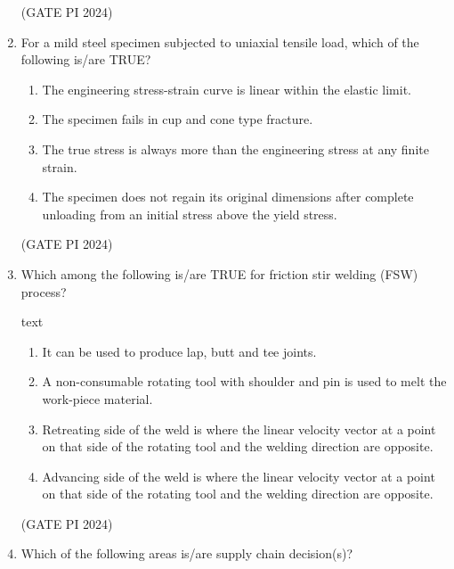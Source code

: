 \documentclass[journal,12pt,onecolumn]{IEEEtran}
\theoremstyle{remark}
\begin{document}
\begin{enumerate}
\hfill (GATE PI 2024)

\item For a mild steel specimen subjected to uniaxial tensile load, which of the following is/are TRUE?
\begin{enumerate}
    \item The engineering stress-strain curve is linear within the elastic limit.
    \item The specimen fails in cup and cone type fracture.
    \item The true stress is always more than the engineering stress at any finite strain.
    \item The specimen does not regain its original dimensions after complete unloading from an initial stress above the yield stress.
\end{enumerate}

\hfill (GATE PI 2024)

\item Which among the following is/are TRUE for friction stir welding (FSW) process?

text
\begin{enumerate}
    \item It can be used to produce lap, butt and tee joints.
    \item A non-consumable rotating tool with shoulder and pin is used to melt the work-piece material.
    \item Retreating side of the weld is where the linear velocity vector at a point on that side of the rotating tool and the welding direction are opposite.
    \item Advancing side of the weld is where the linear velocity vector at a point on that side of the rotating tool and the welding direction are opposite.
\end{enumerate}

\hfill (GATE PI 2024)

\item Which of the following areas is/are supply chain decision(s)?

\begin{enumerate}
\end{enumerate}


\end{enumerate}
\end{document}
